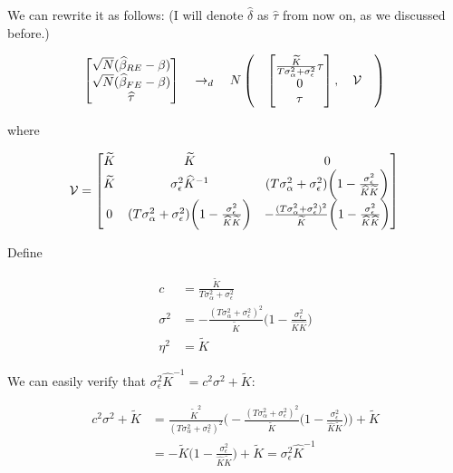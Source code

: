\documentclass[11pt]{article}
\begin{document}
We can rewrite it as follows: (I will denote $\widehat{\delta}$ as $\widehat{\tau}$ from now on, as we discussed before.)

\[
 \begin{bmatrix}
\sqrt{N} (\widehat{\beta}_{RE} - \beta)\\
\sqrt{N} (\widehat{\beta}_{FE} - \beta)\\
\widehat{\tau}
\end{bmatrix} \quad \rightarrow_d \quad  N \left( \quad  \begin{bmatrix}
\frac{\widetilde{K}}{T\sigma_\alpha^2 + \sigma_\epsilon^2} \tau \\
0  \\
\tau\\
\end{bmatrix},  \quad \mathcal{V} \quad  \right)\\
\]

where 

\[
\mathcal{V} =  \begin{bmatrix}
\widetilde{K} & \widetilde{K} & 0 \\
\widetilde{K} & \sigma_\epsilon^2 \widehat{K}^{-1} & (T\sigma_\alpha^2 + \sigma_\epsilon^2) \bigg(1-\frac{\sigma_\epsilon^2}{\widehat{K}\widetilde{K}}\bigg)\\ 
0 & (T\sigma_\alpha^2 + \sigma_\epsilon^2) \bigg(1-\frac{\sigma_\epsilon^2}{\widehat{K}\widetilde{K}}\bigg) & -\frac{(T\sigma_\alpha^2 +\sigma_\epsilon^2)^2}{\widetilde{K}} \bigg(1-\frac{\sigma_\epsilon^2}{\widehat{K}\widehat{K}}\bigg)
\end{bmatrix} \\
\]

Define

\begin{align*}
c& = \frac{\widetilde{K}}{T\sigma_\alpha^2 + \sigma_\epsilon^2}\\
\sigma^2 & = -\frac{(T\sigma_\alpha^2 +\sigma_\epsilon^2)^2}{\widetilde{K}} \bigg(1-\frac{\sigma_\epsilon^2}{\widehat{K}\widehat{K}}\bigg)\\
\eta^2 & = \widetilde{K}
\end{align*}

We can easily verify that $\sigma_\epsilon^2 \widehat{K}^{-1} = c^2 \sigma^2 + \widetilde{K}$:

\begin{align*}
c^2 \sigma^2 + \widetilde{K} & = \frac{\widetilde{K}^2}{(T\sigma_\alpha^2 + \sigma_\epsilon^2)^2} \bigg( -\frac{(T\sigma_\alpha^2 + \sigma_\epsilon^2)^2}{\widetilde{K}} \bigg(1-\frac{\sigma_\epsilon^2}{\widehat{K}\widetilde{K}}\bigg)\bigg) + \widetilde{K}\\
& = -\widetilde{K} \bigg(1- \frac{\sigma_\epsilon^2}{\widehat{K} \widetilde{
K}}\bigg) + \widetilde{K} = \sigma_\epsilon^2 \widehat{K}^{-1}
\end{align*}
\end{document}

